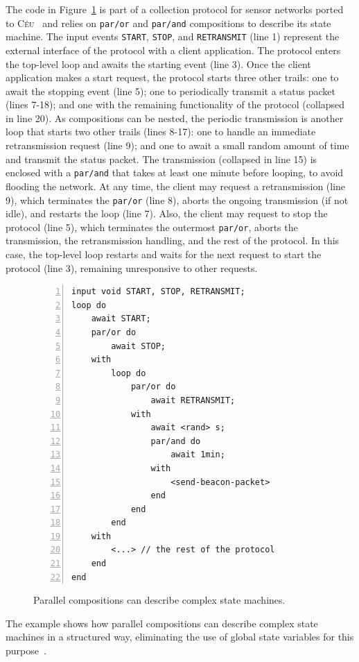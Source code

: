 \documentclass{acm_proc_article-sp}
\newcommand{\CEU}{\textsc{C\'{e}u}\xspace}
\newcommand{\code}[1] {{\small{\texttt{#1}}}}
\newcommand{\1}{\;}
\newcommand{\2}{\;\;}
\newcommand{\3}{\;\;\;}
\newcommand{\5}{\;\;\;\;\;}
\begin{document}
The code in Figure~\ref{lst.ctp} is part of a collection protocol for sensor 
networks ported to \CEU~\cite{wsn.ctp,ceu.sensys13} and relies on \code{par/or} 
and \code{par/and} compositions to describe its state machine.
%
The input events \code{START}, \code{STOP}, and \code{RETRANSMIT} (line 1) 
represent the external interface of the protocol with a client application.
%
The protocol enters the top-level loop and awaits the starting event (line 3).
Once the client application makes a start request, the protocol starts three 
other trails:
one to await the stopping event (line 5);
one to periodically transmit a status packet (lines 7-18);
and one with the remaining functionality of the protocol (collapsed in line 
20).
%
As compositions can be nested, the periodic transmission is another loop that 
starts two other trails (lines 8-17):
one to handle an immediate retransmission request (line 9);
and one to await a small random amount of time and transmit the status packet.
%
The transmission (collapsed in line 15) is enclosed with a \code{par/and} that 
takes at least one minute before looping, to avoid flooding the network.
%
At any time, the client may request a retransmission (line 9), which terminates 
the \code{par/or} (line 8), aborts the ongoing transmission (if not idle), and 
restarts the loop (line 7).
%
Also, the client may request to stop the protocol (line 5), which terminates 
the outermost \code{par/or}, aborts the transmission, the retransmission 
handling, and the rest of the protocol.
In this case, the top-level loop restarts and waits for the next request to 
start the protocol (line 3), remaining unresponsive to other requests.

\begin{figure}[t]
\begin{lstlisting}[numbers=left,xleftmargin=3em]
input void START, STOP, RETRANSMIT;
loop do
    await START;
    par/or do
        await STOP;
    with
        loop do
            par/or do
                await RETRANSMIT;
            with
                await <rand> s;
                par/and do
                    await 1min;
                with
                    <send-beacon-packet>
                end
            end
        end
    with
        <...> // the rest of the protocol
    end
end
\end{lstlisting}
\caption{ Parallel compositions can describe complex state machines.
\label{lst.ctp}
}
\end{figure}

The example shows how parallel compositions can describe complex state machines 
in a structured way, eliminating the use of global state variables for this 
purpose~\cite{ceu.sensys13}.
\end{document}
